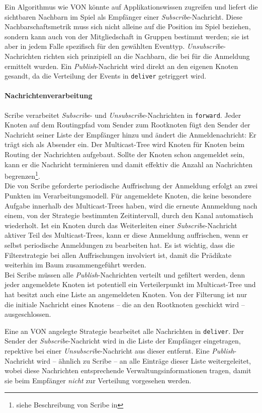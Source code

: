 Ein Algorithmus wie VON könnte auf Applikationswissen zugreifen und liefert die sichtbaren Nachbarn im Spiel als Empfänger einer \emph{Subscribe}-Nachricht. Diese Nachbarschaftsmetrik muss sich nicht alleine auf die Position im Spiel beziehen, sondern kann auch von der Mitgliedschaft in Gruppen bestimmt werden; sie ist aber in jedem Falle spezifisch für den gewählten Eventtyp. \emph{Unsubscribe}-Nachrichten richten sich prinzipiell an die Nachbarn, die bei für die Anmeldung ermittelt wurden. Ein \emph{Publish}-Nachricht wird direkt an den eigenen Knoten gesandt, da die Verteilung der Events in \texttt{deliver} getriggert wird.

\paragraph*{Nachrichtenverarbeitung}
Scribe verarbeitet \emph{Subscribe}- und \emph{Unsubscribe}-Nachrichten in \texttt{forward}. Jeder Knoten auf dem Routingpfad vom Sender zum Rootknoten fügt den Sender der Nachricht seiner Liste der Empfänger hinzu und ändert die Anmeldenachricht: Er trägt sich als Absender ein. Der Multicast-Tree wird Knoten für Knoten beim Routing der Nachrichten aufgebaut. Sollte der Knoten schon angemeldet sein, kann er die Nachricht terminieren und damit effektiv die Anzahl an Nachrichten begrenzen\footnote{siehe Beschreibung von Scribe in }.\\
Die von Scribe geforderte periodische Auffrischung der Anmeldung erfolgt an zwei Punkten im Verarbeitungsmodell. Für angemeldete Knoten, die keine besondere Aufgabe innerhalb des Multicast-Trees haben, wird die erneute Annmeldung nach einem, von der Strategie bestimmten Zeitintervall, durch den Kanal automatisch wiederholt. Ist ein Knoten durch das Weiterleiten einer \emph{Subscribe}-Nachricht aktiver Teil des Multicast-Trees, kann er diese Anmeldung auffrischen, wenn er selbst periodische Anmeldungen zu bearbeiten hat. Es ist wichtig, dass die Filterstrategie bei allen Auffrischungen involviert ist, damit die Prädikate weiterhin im Baum zusammengeführt werden.\\
Bei Scribe müssen alle \emph{Publish}-Nachrichten verteilt und gefiltert werden, denn jeder angemeldete Knoten ist potentiell ein Verteilerpunkt im Multicast-Tree und hat besitzt auch eine Liste an angemeldeten Knoten. Von der Filterung ist nur die initiale Nachricht eines Knotens -- die an den Rootknoten geschickt wird -- ausgeschlossen.

Eine an VON angelegte Strategie bearbeitet alle Nachrichten in \texttt{deliver}. Der Sender der \emph{Subscribe}-Nachricht wird in die Liste der Empfänger eingetragen, repektive bei einer \emph{Unsubscribe}-Nachricht aus dieser entfernt. Eine \emph{Publish}-Nachricht wird -- ähnlich zu Scribe -- an alle Einträge dieser Liste weitergeleitet, wobei diese Nachrichten entsprechende Verwaltungsinformationen tragen, damit sie beim Empfänger \emph{nicht} zur Verteilung vorgesehen werden.

